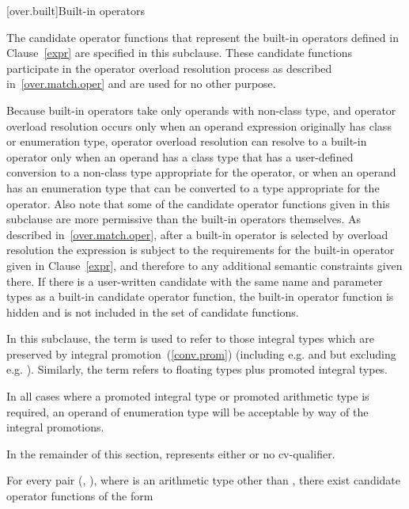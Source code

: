 [over.built]{Built-in operators}%

\pnum
The candidate operator functions that represent the built-in operators
defined in Clause~\ref{expr} are specified in this subclause.
These candidate
functions participate in the operator overload resolution process as
described in~\ref{over.match.oper} and are used for no other purpose.
\begin{note}
Because built-in operators take only operands with non-class type,
and operator overload resolution occurs only when an operand expression
originally has class or enumeration type,
operator overload resolution can resolve to a built-in operator only
when an operand has a class type that has a user-defined conversion to
a non-class type appropriate for the operator, or when an operand has
an enumeration type that can be converted to a type appropriate
for the operator.
Also note that some of the candidate operator functions given in this subclause are
more permissive than the built-in operators themselves.
As
described in~\ref{over.match.oper}, after a built-in operator is selected
by overload resolution the expression is subject to the requirements for
the built-in operator given in Clause~\ref{expr}, and therefore to any
additional semantic constraints given there.
If there is a user-written
candidate with the same name and parameter types as a built-in
candidate operator function, the built-in operator function
is hidden and is not included in the set of candidate functions.
\end{note}

\pnum
{}%
%
In this subclause, the term
is used to refer to those integral types which are preserved by
integral promotion~(\ref{conv.prom}) (including e.g.
and
but excluding e.g.
).
Similarly, the term
refers to floating types plus promoted integral types.
\begin{note}
In all cases where a promoted integral type or promoted arithmetic type is
required, an operand of enumeration type will be acceptable by way of the
integral promotions.
\end{note}

\pnum
In the remainder of this section,  represents either
 or no cv-qualifier.

\pnum
For every pair
(,
),
where
is an arithmetic type other than ,
there exist candidate operator functions of the form


